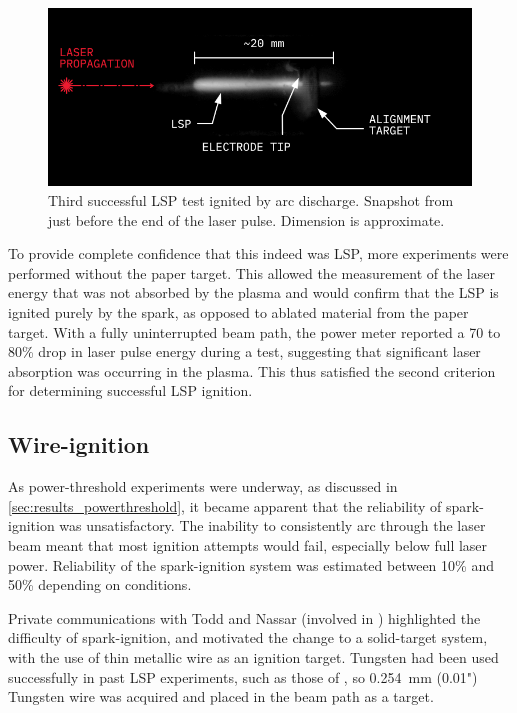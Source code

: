            \begin{figure}[h]
                \centering
                \includegraphics[]{assets/3 design/LSP3_annotated.jpg}
                \caption[Third successful LSP test ignited by arc discharge]{Third successful LSP test ignited by arc discharge. Snapshot from just before the end of the laser pulse. Dimension is approximate.}
                \label{fig:lsp3}
            \end{figure}

            To provide complete confidence that this indeed was LSP, more experiments were performed without the paper target. This allowed the measurement of the laser energy that was not absorbed by the plasma and would confirm that the LSP is ignited purely by the spark, as opposed to ablated material from the paper target. With a fully uninterrupted beam path, the power meter reported a 70 to 80\% drop in laser pulse energy during a test, suggesting that significant laser absorption was occurring in the plasma. This thus satisfied the second criterion for determining successful LSP ignition.

        \subsection{Wire-ignition}
            As power-threshold experiments were underway, as discussed in \autoref{sec:results_powerthreshold}, it became apparent that the reliability of spark-ignition was unsatisfactory. The inability to consistently arc through the laser beam meant that most ignition attempts would fail, especially below full laser power. Reliability of the spark-ignition system was estimated between 10\% and 50\% depending on conditions.

            Private communications with Todd and Nassar (involved in \cite{akarapuNumericalModelLasersustained2009,nassarInvestigationLasersustainedPlasma2012}) highlighted the difficulty of spark-ignition, and motivated the change to a solid-target system, with the use of thin metallic wire as an ignition target. Tungsten had been used successfully in past LSP experiments, such as those of \textcite{toyodaThrustPerformanceCW2002}, so \qty{0.254}{mm} (0.01") Tungsten wire was acquired and placed in the beam path as a target.

